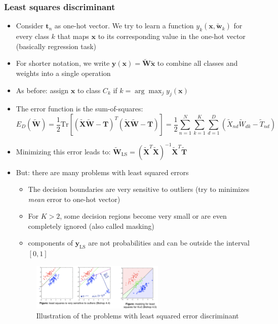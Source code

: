 \subsubsection{Least squares discriminant}
\begin{itemize}
	\item Consider $\bm{t}_n$ as one-hot vector. We try to learn a function $y_k(\bm{x}, \bm{\tilde{w}}_k)$ for every class $k$ that maps $\bm{x}$ to its corresponding value in the one-hot vector (basically regression task)
	\item For shorter notation, we write $\bm{y}(\bm{x}) = \bm{\tilde{W}}\bm{\tilde{x}}$ to combine all classes and weights into a single operation
	\item As before: assign $\bm{x}$ to class $C_k$ if $k=\arg\max_j y_j (\bm{x})$
	\item The error function is the sum-of-squares: $$E_D(\bm{\tilde{W}}) = \frac{1}{2} \text{Tr}\left[\left(\bm{\tilde{X}}\bm{\tilde{W}}-\bm{T}\right)^T\left(\bm{\tilde{X}}\bm{\tilde{W}}-\bm{T}\right)\right] = \frac{1}{2}\sum\limits_{n=1}^{N}\sum\limits_{k=1}^{K}\sum\limits_{d=1}^{D}\left(\tilde{X}_{nd}\tilde{W}_{dk}-\tilde{T}_{nd}\right)$$
	\item Minimizing this error leads to:  $\bm{\tilde{W}}_{\text{LS}} = \left(\bm{\tilde{X}}^T \bm{\tilde{X}}\right)^{-1}\bm{\tilde{X}}^T \bm{\tilde{T}}$
	\item But: there are many problems with least squared errors
	\begin{itemize}
		\item The decision boundaries are very sensitive to outliers (try to minimizes \textit{mean} error to one-hot vector)
		\item For $K>2$, some decision regions become very small or are even completely ignored (also called masking)
		\item components of $\bm{y}_{\text{LS}}$ are not probabilities and can be outside the interval $\left[0,1\right]$
	\end{itemize}
	\begin{figure}[ht]
		\centering
		\includegraphics[width=0.6\textwidth]{figures/discriminant_function_least_squares_problem.png}
		\caption{Illustration of the problems with least squared error discriminant}
		\label{img:discriminant_function_least_squares_problem}
	\end{figure}
\end{itemize}
